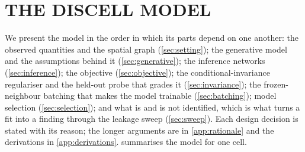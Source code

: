 \section{THE DISCELL MODEL}
\label{sec:method}

 We present the model in the order in which its parts depend on one another: the observed quantities and the spatial graph (\cref{sec:setting}); the generative model and the assumptions behind it (\cref{sec:generative}); the inference networks (\cref{sec:inference}); the objective (\cref{sec:objective}); the conditional-invariance regulariser and the held-out probe that grades it (\cref{sec:invariance}); the frozen-neighbour batching that makes the model trainable (\cref{sec:batching}); model selection (\cref{sec:selection}); and what is and is not identified, which is what turns a fit into a finding through the leakage sweep (\cref{sec:sweep}). Each design decision is stated with its reason; the longer arguments are in \cref{app:rationale} and the derivations in \cref{app:derivations}.  summarises the model for one cell.

